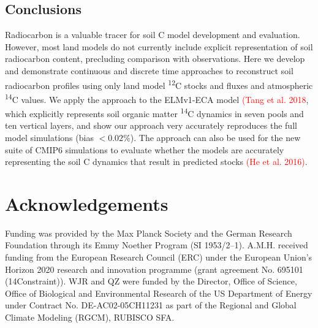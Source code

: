 \documentclass[11pt,a4paper]{article}
\newcommand{\red}[1]{\textcolor{red}{#1}}
\begin{document}
\subsection{Conclusions}
Radiocarbon is a valuable tracer for soil C model development and evaluation. However, most land models do not currently include explicit representation of soil radiocarbon content, precluding comparison with observations. Here we develop and demonstrate continuous and discrete time approaches to reconstruct soil radiocarbon profiles using only land model \textsuperscript{12}C stocks and fluxes and atmospheric \textsuperscript{14}C values. We apply the approach to the ELMv1-ECA model \citep{Zhu2019, Riley2018}\red{(Tang et al. 2018}, which explicitly represents soil organic matter \textsuperscript{14}C dynamics in seven pools and ten vertical layers, and show our approach very accurately reproduces the full model simulations (bias $<0.02$\%). The approach can also be used for the new suite of CMIP6 simulations to evaluate whether the models are accurately representing the soil C dynamics that result in predicted stocks \red{(He et al. 2016)}. 

\section*{Acknowledgements}
Funding was provided by the Max Planck Society and the German Research Foundation through its Emmy Noether Program (SI 1953/2--1). A.M.H. received funding from the European Research Council (ERC) under the European Union’s Horizon 2020 research and innovation programme (grant agreement No. 695101 (14Constraint)). WJR and QZ were funded by the Director, Office of Science, Office of Biological and Environmental Research of the US Department of Energy under Contract No. DE-AC02-05CH11231 as part of the Regional and Global Climate Modeling (RGCM), RUBISCO SFA.


%

\end{document}
